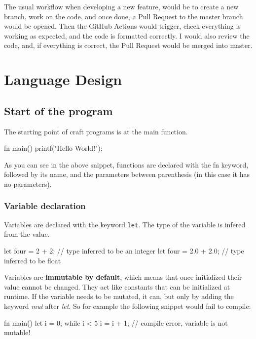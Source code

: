 ﻿\documentclass[10pt,a4paper,twocolumn,twoside]{article}
\begin{document}
The usual workflow when developing a new feature, would be to create a new
branch, work on the code, and once done, a Pull Request to the master branch
would be opened. Then the GitHub Actions would trigger, check everything is 
working as expected, and the code is formatted correctly. I would also review 
the code, and, if everything is correct, the Pull Request would be merged into
master.

\section{Language Design}

\subsection{Start of the program}
The starting point of craft programs is at the main function.

\begin{code}
fn main() {
    printf("Hello World!\n");
}
\end{code}

As you can see in the above snippet, functions are declared with the fn keyword,
followed by its name, and  the parameters between parenthesis (in this case it 
has no parameters).

\subsubsection{Variable declaration}
Variables are declared with the keyword \texttt{let}. The type of the variable
is infered from the value.

\begin{code}
let four = 2 + 2; // type inferred to be an integer
let four = 2.0 + 2.0; // type inferred to be float
\end{code}

Variables are \textbf{immutable by default}, which means that once initialized
their value cannot be changed. They act like constants that can be initialized
at runtime. If the variable needs to be mutated, it can, but only by adding the
keyword \textit{mut} after \textit{let}. So for example the following snippet
would fail to compile:

\begin{code}
    fn main() {
        let i = 0;
        while i < 5 {
            i = i + 1; // compile error, variable is not mutable!
        }
    }
\end{code}
\end{document}
